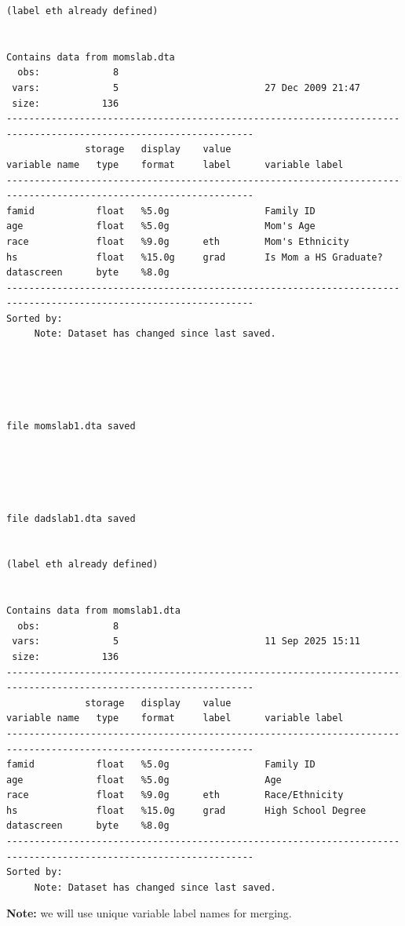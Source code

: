 \documentclass[
]{book}
\begin{document}
\begin{verbatim}
(label eth already defined)


Contains data from momslab.dta
  obs:             8                          
 vars:             5                          27 Dec 2009 21:47
 size:           136                          
------------------------------------------------------------------------------------------------------------------
              storage   display    value
variable name   type    format     label      variable label
------------------------------------------------------------------------------------------------------------------
famid           float   %5.0g                 Family ID
age             float   %5.0g                 Mom's Age
race            float   %9.0g      eth        Mom's Ethnicity
hs              float   %15.0g     grad       Is Mom a HS Graduate?
datascreen      byte    %8.0g                 
------------------------------------------------------------------------------------------------------------------
Sorted by: 
     Note: Dataset has changed since last saved.





file momslab1.dta saved





file dadslab1.dta saved


(label eth already defined)


Contains data from momslab1.dta
  obs:             8                          
 vars:             5                          11 Sep 2025 15:11
 size:           136                          
------------------------------------------------------------------------------------------------------------------
              storage   display    value
variable name   type    format     label      variable label
------------------------------------------------------------------------------------------------------------------
famid           float   %5.0g                 Family ID
age             float   %5.0g                 Age
race            float   %9.0g      eth        Race/Ethnicity
hs              float   %15.0g     grad       High School Degree
datascreen      byte    %8.0g                 
------------------------------------------------------------------------------------------------------------------
Sorted by: 
     Note: Dataset has changed since last saved.
\end{verbatim}

\textbf{Note:} we will use unique variable label names for merging.
\end{document}
